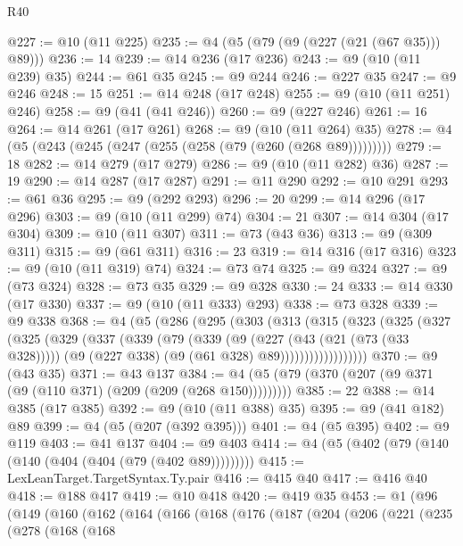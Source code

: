 \begin{lexlean}{R40}
\begin{coremodule}
@227 := @10 (@11 @225)
@235 := @4 (@5 (@79 (@9 (@227 (@21 (@67 @35))) @89)))
@236 := 14
@239 := @14 @236 (@17 @236)
@243 := @9 (@10 (@11 @239) @35)
@244 := @61 @35
@245 := @9 @244
@246 := @227 @35
@247 := @9 @246
@248 := 15
@251 := @14 @248 (@17 @248)
@255 := @9 (@10 (@11 @251) @246)
@258 := @9 (@41 (@41 @246))
@260 := @9 (@227 @246)
@261 := 16
@264 := @14 @261 (@17 @261)
@268 := @9 (@10 (@11 @264) @35)
@278 := @4 (@5 (@243 (@245 (@247 (@255 (@258 (@79 (@260 (@268 @89)))))))))
@279 := 18
@282 := @14 @279 (@17 @279)
@286 := @9 (@10 (@11 @282) @36)
@287 := 19
@290 := @14 @287 (@17 @287)
@291 := @11 @290
@292 := @10 @291
@293 := @61 @36
@295 := @9 (@292 @293)
@296 := 20
@299 := @14 @296 (@17 @296)
@303 := @9 (@10 (@11 @299) @74)
@304 := 21
@307 := @14 @304 (@17 @304)
@309 := @10 (@11 @307)
@311 := @73 (@43 @36)
@313 := @9 (@309 @311)
@315 := @9 (@61 @311)
@316 := 23
@319 := @14 @316 (@17 @316)
@323 := @9 (@10 (@11 @319) @74)
@324 := @73 @74
@325 := @9 @324
@327 := @9 (@73 @324)
@328 := @73 @35
@329 := @9 @328
@330 := 24
@333 := @14 @330 (@17 @330)
@337 := @9 (@10 (@11 @333) @293)
@338 := @73 @328
@339 := @9 @338
@368 := @4
    (@5
      (@286
        (@295
          (@303
            (@313
              (@315
                (@323
                  (@325
                    (@327
                      (@325
                        (@329
                          (@337
                            (@339
                              (@79
                                (@339
                                  (@9
                                    (@227 (@43 (@21 (@73 (@33 @328)))))
                                    (@9 (@227 @338) (@9 (@61 @328) @89))))))))))))))))))
@370 := @9 (@43 @35)
@371 := @43 @137
@384 := @4 (@5 (@79 (@370 (@207 (@9 @371 (@9 (@110 @371) (@209 (@209 (@268 @150)))))))))
@385 := 22
@388 := @14 @385 (@17 @385)
@392 := @9 (@10 (@11 @388) @35)
@395 := @9 (@41 @182) @89
@399 := @4 (@5 (@207 (@392 @395)))
@401 := @4 (@5 @395)
@402 := @9 @119
@403 := @41 @137
@404 := @9 @403
@414 := @4 (@5 (@402 (@79 (@140 (@140 (@404 (@404 (@79 (@402 @89)))))))))
@415 := LexLeanTarget.TargetSyntax.Ty.pair
@416 := @415 @40
@417 := @416 @40
@418 := @188 @417
@419 := @10 @418
@420 := @419 @35
@453 := @1
    (@96
      (@149
        (@160
          (@162
            (@164
              (@166
                (@168
                  (@176
                    (@187
                      (@204
                        (@206
                          (@221
                            (@235
                              (@278
                                (@168
                                  (@168

\end{coremodule}
\end{lexlean}
